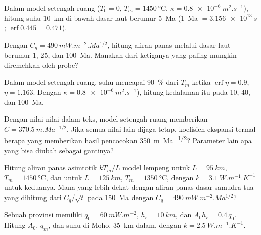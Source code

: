 \begin{exercise}[$\star$]\label{exo:b3:lithosphere-thermal-models:3}
Dalam model setengah-ruang ($T_0 = 0$, $T_m = \qty{1450}{\celsius}$, $\kappa =
\qty{0.8e-6}{m^2.s^{-1}}$), hitung suhu \qty{10}{km} di bawah dasar laut
berumur \qty{5}{Ma} (\qty{1}{Ma} $= \qty{3.156e13}{s}$; $\operatorname{erf}
0.445 = 0.471$).
\end{exercise}

\begin{exercise}[$\star$]\label{exo:b3:lithosphere-thermal-models:4}
Dengan $C_q = \qty{490}{mW.m^{-2}.Ma^{1/2}}$, hitung aliran panas melalui
dasar laut berumur 1, 25, dan \qty{100}{Ma}. Manakah dari ketiganya
yang paling mungkin diremehkan oleh probe?
\end{exercise}

\begin{exercise}[$\star\star$]\label{exo:b3:lithosphere-thermal-models:5}
Dalam model setengah-ruang, suhu mencapai \qty{90}{\percent} dari $T_m$
ketika $\operatorname{erf}\eta = 0.9$, $\eta = 1.163$. Dengan $\kappa =
\qty{0.8e-6}{m^2.s^{-1}}$), hitung kedalaman itu pada 10, 40, dan \qty{100}{Ma}.
\end{exercise}

\begin{exercise}[$\star\star$]\label{exo:b3:lithosphere-thermal-models:6}
Dengan nilai-nilai dalam teks, model setengah-ruang memberikan $C =
\qty{370.5}{m.Ma^{-1/2}}$. Jika semua nilai lain dijaga tetap, koefisien ekspansi termal
berapa yang memberikan hasil pencocokan \qty{350}{m.Ma^{-1/2}}? Parameter lain
apa yang bisa diubah sebagai gantinya?
\end{exercise}

\begin{exercise}[$\star\star$]\label{exo:b3:lithosphere-thermal-models:7}
Hitung aliran panas asimtotik $kT_m/L$ model lempeng untuk $L =
\qty{95}{km}$, $T_m = \qty{1450}{\celsius}$, dan untuk $L = \qty{125}{km}$,
$T_m = \qty{1350}{\celsius}$, dengan $k = \qty{3.1}{W.m^{-1}.K^{-1}}$ untuk keduanya.
Mana yang lebih dekat dengan aliran panas dasar samudra tua yang dihitung dari $C_q/\sqrt t$
pada \qty{150}{Ma} dengan $C_q = \qty{490}{mW.m^{-2}.Ma^{1/2}}$?
\end{exercise}

\begin{exercise}[$\star\star$]\label{exo:b3:lithosphere-thermal-models:8}
Sebuah provinsi memiliki $q_0 = \qty{60}{mW.m^{-2}}$, $h_r = \qty{10}{km}$, dan $A_0h_r =
0.4\,q_0$. Hitung $A_0$, $q_m$, dan suhu di Moho, \qty{35}{km}
dalam, dengan $k = \qty{2.5}{W.m^{-1}.K^{-1}}$.
\end{exercise}

